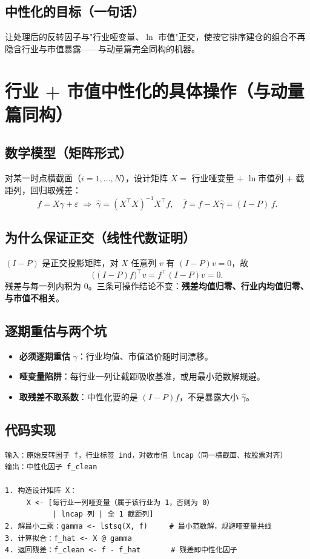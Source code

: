 \documentclass[UTF8,11pt]{ctexart}
\begin{document}
\subsection{中性化的目标（一句话）}
让处理后的反转因子与"行业哑变量、$\ln$ 市值"正交，使按它排序建仓的组合不再隐含行业与市值暴露——与动量篇完全同构的机器。

\section{行业 + 市值中性化的具体操作（与动量篇同构）}

\subsection{数学模型（矩阵形式）}
对某一时点横截面（$i=1,\dots,N$），设计矩阵 $X=$ 行业哑变量 $+$ $\ln$市值列 $+$ 截距列，回归取残差：
\begin{equation}
f = X\gamma + \varepsilon
\;\Rightarrow\;
\hat\gamma=(X^{\top}X)^{-1}X^{\top}f,\quad
\bar f = f-X\hat\gamma = (I-P)\,f.
\end{equation}

\subsection{为什么保证正交（线性代数证明）}
$(I-P)$ 是正交投影矩阵，对 $X$ 任意列 $v$ 有 $(I-P)v=0$，故
\begin{equation}
\big((I-P)f\big)^{\top}v = f^{\top}(I-P)v = 0.
\end{equation}
残差与每一列内积为 0。三条可操作结论不变：\textbf{残差均值归零、行业内均值归零、与市值不相关}。

\subsection{逐期重估与两个坑}
\begin{itemize}[itemsep=2pt]
\item \textbf{必须逐期重估} $\gamma$：行业均值、市值溢价随时间漂移。
\item \textbf{哑变量陷阱}：每行业一列让截距吸收基准，或用最小范数解规避。
\item \textbf{取残差不取系数}：中性化要的是 $(I-P)f$，不是暴露大小 $\hat\gamma$。
\end{itemize}

\subsection{代码实现}
\begin{lstlisting}[language={},caption={行业 + 市值中性化（伪代码）}]
输入：原始反转因子 f，行业标签 ind，对数市值 lncap（同一横截面、按股票对齐）
输出：中性化因子 f_clean

1. 构造设计矩阵 X：
     X <- [每行业一列哑变量（属于该行业为 1，否则为 0）
           | lncap 列 | 全 1 截距列]
2. 解最小二乘：gamma <- lstsq(X, f)     # 最小范数解，规避哑变量共线
3. 计算拟合：f_hat <- X @ gamma
4. 返回残差：f_clean <- f - f_hat       # 残差即中性化因子
\end{lstlisting}
\end{document}
